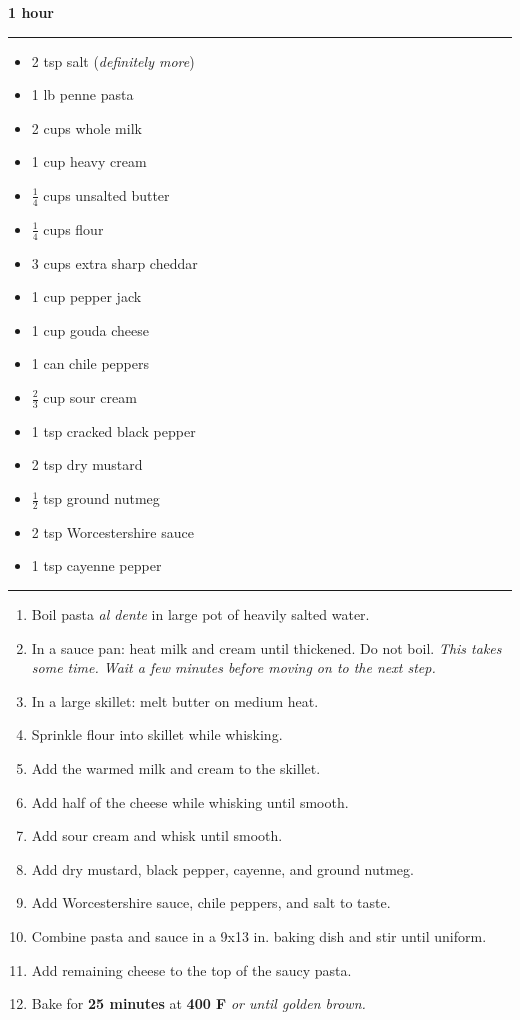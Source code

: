  \hfill {\large \textbf{1 hour}}

\vspace{15pt} \hrule \vspace{15pt}
\begin{itemize}
	\item 2 tsp salt (\textit{definitely more})
	\item 1 lb penne pasta
	\item 2 cups whole milk
	\item 1 cup heavy cream
	\item $\frac{1}{4}$ cups unsalted butter
	\item $\frac{1}{4}$ cups flour
	\item 3 cups extra sharp cheddar
	\item 1 cup pepper jack
	\item 1 cup gouda cheese
	\item 1 can chile peppers
	\item $\frac{2}{3}$ cup sour cream
	\item 1 tsp cracked black pepper
	\item 2 tsp dry mustard
	\item $\frac{1}{2}$ tsp ground nutmeg
	\item 2 tsp Worcestershire sauce
	\item 1 tsp cayenne pepper
\end{itemize}

\vspace{15pt} \hrule \vspace{15pt}
\begin{enumerate}
	\item Boil pasta \textit{al dente} in large pot of heavily salted water.
	\item In a sauce pan: heat milk and cream until thickened. Do not boil. \textit{This takes some time. Wait a few minutes before moving on to the next step.}
	\item In a large skillet: melt butter on medium heat.
	\item Sprinkle flour into skillet while whisking.
	\item Add the warmed milk and cream to the skillet.
	\item Add half of the cheese while whisking until smooth.
	\item Add sour cream and whisk until smooth.
	\item Add dry mustard, black pepper, cayenne, and ground nutmeg.
	\item Add Worcestershire sauce, chile peppers, and salt to taste.
	\item Combine pasta and sauce in a 9x13 in. baking dish and stir until uniform.
	\item Add remaining cheese to the top of the saucy pasta.
	\item Bake for \textbf{25 minutes} at \textbf{400 F} \textit{or until golden brown.}
\end{enumerate}
